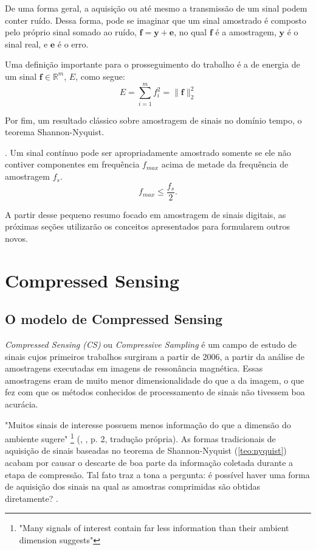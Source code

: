 \documentclass[cic,tc]{iiufrgs}
\renewcommand{\vec}[1]{\bm{#1}}
\begin{document}
De uma forma geral, a aquisição ou até mesmo a transmissão de um sinal podem conter ruído.
Dessa forma, pode se imaginar que um sinal amostrado é composto pelo próprio sinal somado ao ruído,
$\vec{f} = \vec{y} + \vec{e}$, no qual $\vec{f}$ é a amostragem, $\vec{y}$ é o sinal real, 
e $\vec{e}$ é o erro.


Uma definição importante para o prosseguimento do trabalho é a de energia de um sinal $\vec{f} \in \mathbb{R}^m$,
$E$, como segue:
\begin{equation}
    E = \sum_{i=1}^m f_i^2 = \lVert \vec{f} \rVert_2^2
\end{equation}

Por fim, um resultado clássico sobre amostragem de sinais no domínio tempo, o teorema Shannon-Nyquist.
\begin{teorema}
    \cite{NyquistSampling}.
    Um sinal contínuo pode ser apropriadamente amostrado somente se ele não contiver 
    componentes em frequência $f_{max}$ acima de metade da frequência de amostragem $f_s$.
    \begin{equation*}
        f_{max} \le \frac{f_s}{2}.
    \end{equation*}
    \label{teo:nyquist}
\end{teorema}

A partir desse pequeno resumo focado em amostragem de sinais digitais,
as próximas seções utilizarão os conceitos apresentados para formularem outros novos.

\section{Compressed Sensing}
\subsection{O modelo de Compressed Sensing}
\textit{Compressed Sensing (CS)} ou \textit{Compressive Sampling} é um campo de estudo de sinais cujos
primeiros trabalhos surgiram a partir de 2006, a partir da análise de amostragens executadas em imagens de 
ressonância magnética. Essas amostragens eram de muito menor dimensionalidade do que a da imagem, o que 
fez com que os métodos conhecidos de processamento de sinais não tivessem boa acurácia.

"Muitos sinais de interesse possuem menos informação do que a dimensão do ambiente sugere"
\footnote{"Many signals of interest contain far less information than their ambient dimension suggests"}
(\citeauthor{chen2015compressed}, \citeyear{chen2015compressed}, p. 2, tradução própria).
As formas tradicionais de aquisição de sinais baseadas no teorema de Shannon-Nyquist (\ref{teo:nyquist}) acabam por causar o descarte
de boa parte da informação coletada durante a etapa de compressão. Tal fato traz a tona a pergunta: é possível haver 
uma forma de aquisição dos sinais na qual as amostras comprimidas são obtidas diretamente? \cite{chen2015compressed}.
\end{document}
